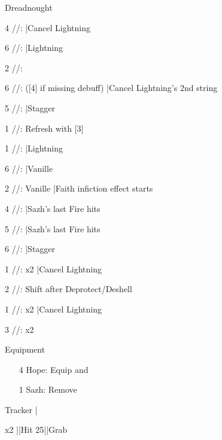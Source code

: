 \begin{fight}{Dreadnought}
	\item [4] \rav/\rav/\sab:  \to {} |Cancel Lightning
	\item [6] \rav/\rav/\rav: |Lightning
	\item [2] \syn/\com/\sab: 
	\item [6] \rav/\rav/\rav: ([4] if missing debuff) 
	|Cancel Lightning's 2nd string
	\item [5] \rav/\rav/\rav:  \to {}
	|Stagger
	\item [1] \rav/\com/\rav:  \to Refresh with [3]
	\item \skip
	\item [1] \rav/\com/\rav:  |Lightning
	\item [6] \rav/\rav/\rav: |Vanille
	\item [2] \syn/\com/\sab:  \to {} Vanille |Faith infiction effect starts
	\item [4] \rav/\rav/\sab:  |Sazh's last Fire hits
	\item [5] \rav/\rav/\rav:  |Sazh's last Fire hits
	\item [6] \rav/\rav/\rav:  \to {} |Stagger
	\item [1] \rav/\com/\rav:  x2 |Cancel Lightning
	\item [2] \syn/\com/\sab: Shift after Deprotect/Deshell
	\item [1] \rav/\com/\rav:  x2 |Cancel Lightning
	\item [3] \rav/\com/\rav:  x2
	\item \skip
\end{fight}

\begin{menu}
	\item Equipment
	\begin{itemize}
		\item [4] Hope: Equip  and 
		\item [1] Sazh: Remove 
	\end{itemize}
\end{menu}

\begin{mainlist}
	\item {}
	\item {} Tracker \to
	[2]  \to {} |
	\item \skip
	\item {}  x2 \to
	 |\skip|Hit 25|\skip|Grab 
\end{mainlist}

